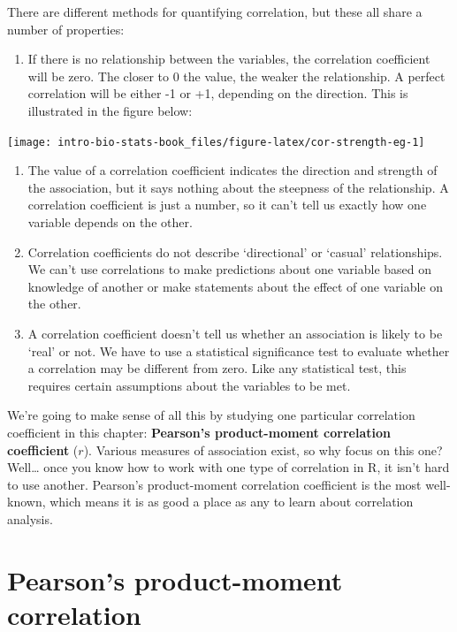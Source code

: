 \documentclass[
]{book}
\providecommand{\tightlist}{%
  \setlength{\itemsep}{0pt}\setlength{\parskip}{0pt}}
\begin{document}
There are different methods for quantifying correlation, but these all share a number of properties:

\begin{enumerate}
\def\labelenumi{\arabic{enumi}.}
\tightlist
\item
  If there is no relationship between the variables, the correlation coefficient will be zero. The closer to 0 the value, the weaker the relationship. A perfect correlation will be either -1 or +1, depending on the direction. This is illustrated in the figure below:
\end{enumerate}

\begin{center}\texttt{[image: intro-bio-stats-book\_files/figure-latex/cor-strength-eg-1]} \end{center}

\begin{enumerate}
\def\labelenumi{\arabic{enumi}.}
\setcounter{enumi}{1}
\item
  The value of a correlation coefficient indicates the direction and strength of the association, but it says nothing about the steepness of the relationship. A correlation coefficient is just a number, so it can't tell us exactly how one variable depends on the other.
\item
  Correlation coefficients do not describe `directional' or `casual' relationships. We can't use correlations to make predictions about one variable based on knowledge of another or make statements about the effect of one variable on the other.
\item
  A correlation coefficient doesn't tell us whether an association is likely to be `real' or not. We have to use a statistical significance test to evaluate whether a correlation may be different from zero. Like any statistical test, this requires certain assumptions about the variables to be met.
\end{enumerate}

We're going to make sense of all this by studying one particular correlation coefficient in this chapter: \textbf{Pearson's product-moment correlation coefficient} (\(r\)). Various measures of association exist, so why focus on this one? Well\ldots{} once you know how to work with one type of correlation in R, it isn't hard to use another. Pearson's product-moment correlation coefficient is the most well-known, which means it is as good a place as any to learn about correlation analysis.

\hypertarget{pearsons-product-moment-correlation}{%
\section{Pearson's product-moment correlation}\label{pearsons-product-moment-correlation}}
\end{document}
